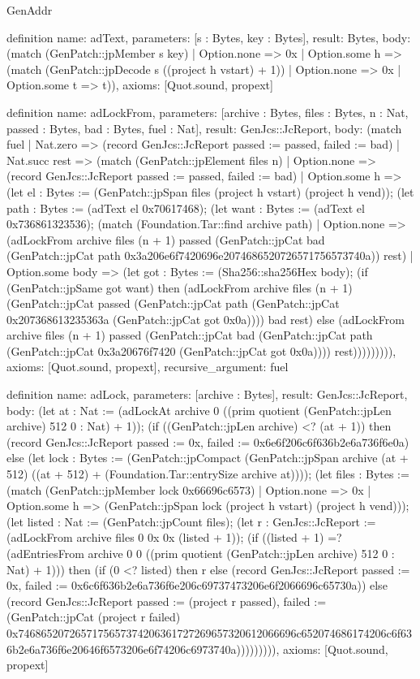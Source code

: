 \begin{lexlean}{GenAddr}
\begin{semanticmodule}
definition{
  name: adText,
  parameters: [s : Bytes, key : Bytes],
  result: Bytes,
  body: (match (GenPatch::jpMember s key)
    | Option.none => 0x
    | Option.some h => (match (GenPatch::jpDecode s ((project h vstart) + 1))
      | Option.none => 0x
      | Option.some t => t)),
  axioms: [Quot.sound, propext]
}

definition{
  name: adLockFrom,
  parameters: [archive : Bytes, files : Bytes, n : Nat, passed : Bytes, bad : Bytes, fuel : Nat],
  result: GenJcs::JcReport,
  body: (match fuel
    | Nat.zero => (record GenJcs::JcReport {passed := passed, failed := bad})
    | Nat.succ rest => (match (GenPatch::jpElement files n)
      | Option.none => (record GenJcs::JcReport {passed := passed, failed := bad})
      | Option.some h => (let el : Bytes := (GenPatch::jpSpan files (project h vstart) (project h vend)); (let path : Bytes := (adText el 0x70617468); (let want : Bytes := (adText el 0x736861323536); (match (Foundation.Tar::find archive path)
        | Option.none => (adLockFrom archive files (n + 1) passed (GenPatch::jpCat bad (GenPatch::jpCat path 0x3a206e6f7420696e2074686520726571756573740a)) rest)
        | Option.some body => (let got : Bytes := (Sha256::sha256Hex body); (if (GenPatch::jpSame got want) then (adLockFrom archive files (n + 1) (GenPatch::jpCat passed (GenPatch::jpCat path (GenPatch::jpCat 0x207368613235363a (GenPatch::jpCat got 0x0a)))) bad rest) else (adLockFrom archive files (n + 1) passed (GenPatch::jpCat bad (GenPatch::jpCat path (GenPatch::jpCat 0x3a20676f7420 (GenPatch::jpCat got 0x0a)))) rest))))))))),
  axioms: [Quot.sound, propext],
  recursive_argument: fuel
}

definition{
  name: adLock,
  parameters: [archive : Bytes],
  result: GenJcs::JcReport,
  body: (let at : Nat := (adLockAt archive 0 ((prim quotient (GenPatch::jpLen archive) 512 0 : Nat) + 1)); (if ((GenPatch::jpLen archive) <? (at + 1)) then (record GenJcs::JcReport {passed := 0x, failed := 0x6e6f206c6f636b2e6a736f6e0a}) else (let lock : Bytes := (GenPatch::jpCompact (GenPatch::jpSpan archive (at + 512) ((at + 512) + (Foundation.Tar::entrySize archive at)))); (let files : Bytes := (match (GenPatch::jpMember lock 0x66696c6573)
    | Option.none => 0x
    | Option.some h => (GenPatch::jpSpan lock (project h vstart) (project h vend))); (let listed : Nat := (GenPatch::jpCount files); (let r : GenJcs::JcReport := (adLockFrom archive files 0 0x 0x (listed + 1)); (if ((listed + 1) =? (adEntriesFrom archive 0 0 ((prim quotient (GenPatch::jpLen archive) 512 0 : Nat) + 1))) then (if (0 <? listed) then r else (record GenJcs::JcReport {passed := 0x, failed := 0x6c6f636b2e6a736f6e206c69737473206e6f2066696c65730a})) else (record GenJcs::JcReport {passed := (project r passed), failed := (GenPatch::jpCat (project r failed) 0x7468652072657175657374206361727269657320612066696c652074686174206c6f636b2e6a736f6e20646f6573206e6f74206c6973740a)})))))))),
  axioms: [Quot.sound, propext]
}
\end{semanticmodule}
\end{lexlean}
